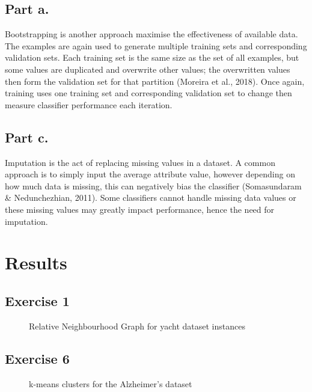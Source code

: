 \documentclass[11pt, a4paper]{article}
\begin{document}
\subsection{Part a.}
Bootstrapping is another approach maximise the effectiveness of available data. The examples are again used to generate multiple training sets and corresponding validation sets. Each training set is the same size as the set of all examples, but some values are duplicated and overwrite other values; the overwritten values then form the validation set for that partition (Moreira et al., 2018). Once again, training uses one training set and corresponding validation set to change then measure classifier performance each iteration.

\subsection{Part c.}
Imputation is the act of replacing missing values in a dataset. A common approach is to simply input the average attribute value, however depending on how much data is missing, this can negatively bias the classifier (Somasundaram \& Nedunchezhian, 2011). Some classifiers cannot handle missing data values or these missing values may greatly impact performance, hence the need for imputation.

\section{Results}

\subsection{Exercise 1}

\begin{figure}[H]
\caption{Relative Neighbourhood Graph for yacht dataset instances}\label{figR1}
\end{figure}

\subsection{Exercise 6}

\begin{figure}[H]
\caption{k-means clusters for the Alzheimer's dataset}\label{figR6}
\end{figure}
\end{document}

